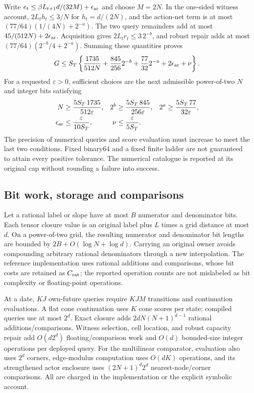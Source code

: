 Write $e_t\le\beta L_{t+1}d/(32M)+\epsilon_{\rm ar}$ and choose $M=2N$. In the one-sided witness account, $2L_th_t\le3/N$ for $h_t=d/(2N)$, and the action-net term is at most $(77/64)(1/(4N)+2^{-a})$. The two query remainders add at most $45/(512N)+2\epsilon_{\rm ar}$. Acquisition gives $2L_tr_t\le3\,2^{-b}$, and robust repair adds at most $(77/64)(2^{-b}/4+2^{-a})$. Summing these quantities proves
\[
 G\le S_T\left\{\frac{1735}{512N}+\frac{845}{256}2^{-b}
                  +\frac{77}{32}2^{-a}+2\epsilon_{\rm ar}+\nu\right\}.
\]
For a requested $\varepsilon>0$, sufficient choices are the next admissible power-of-two $N$ and integer bits satisfying
\begin{align*}
 N&\ge\frac{5S_T\,1735}{512\varepsilon},&
 2^b&\ge\frac{5S_T\,845}{256\varepsilon},&
 2^a&\ge\frac{5S_T\,77}{32\varepsilon},\\
 \epsilon_{\rm ar}&\le\frac{\varepsilon}{10S_T},&
 \nu&\le\frac{\varepsilon}{5S_T}.&&
\end{align*}
The precision of numerical queries and score evaluation must increase to meet the last two conditions. Fixed binary64 and a fixed finite ladder are not guaranteed to attain every positive tolerance. The numerical catalogue is reported at its original cap without rounding a failure into success.

\subsection{Bit work, storage and comparisons}
Let a rational label or slope have at most $B$ numerator and denominator bits. Each tensor closure value is an original label plus $L$ times a grid distance at most $d$. On a power-of-two grid, the resulting numerator and denominator bit lengths are bounded by $2B+O(\log N+\log d)$. Carrying an original owner avoids compounding arbitrary rational denominators through a new interpolation. The reference implementation uses rational additions and comparisons, whose bit costs are retained as $C_{\rm rat}$; the reported operation counts are not mislabeled as bit complexity or floating-point operations.

At a date, $KJ$ own-future queries require $KJM$ transitions and continuation evaluations. A flat cone continuation uses $K$ cone scores per state; compiled queries use at most $2^d$. Exact closure adds $2dN(N+1)^{d-1}$ rational additions/comparisons. Witness selection, cell location, and robust capacity repair add $O(d2^d)$ floating/comparison work and $O(d)$ bounded-size integer operations per deployed query. For the multilinear comparator, evaluation also uses $2^d$ corners, edge-modulus computation uses $O(dK)$ operations, and its strengthened actor enclosure uses $(2N+1)^d2^d$ nearest-node/corner comparisons. All are charged in the implementation or the explicit symbolic account.

